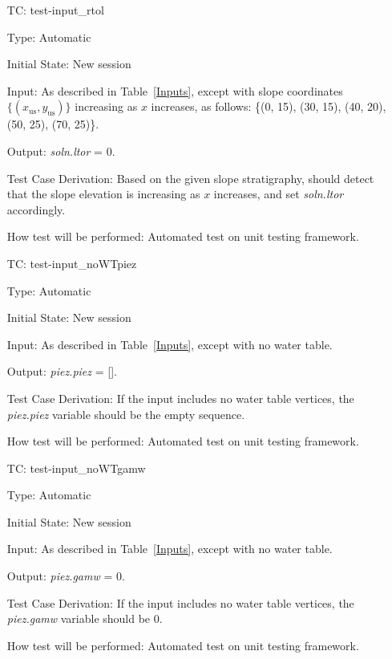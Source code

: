 \documentclass[12pt, titlepage]{article}
\newcounter{utestnum} %
\begin{document}
\begin{enumerate}[label=TC\arabic*:,ref={\arabic*}]

\item [TC\refstepcounter{utestnum}\theutestnum: \label{TC_InputRtoL}] 
test-input\_rtol

Type: Automatic
					
Initial State: New session
					
Input: As described in Table~\ref{Inputs}, except with slope coordinates 
$\{\left(x_\text{us},y_\text{us}\right)\}$ increasing as $x$ increases, as 
follows: \{(0, 
15), (30, 15), (40, 20), (50, 25), (70, 25)\}.
					
Output: \textit{soln.ltor} = 0.

Test Case Derivation: Based on the given slope stratigraphy, \progname{} should 
detect that the slope elevation is increasing as $x$ increases, and set 
\textit{soln.ltor} accordingly.

How test will be performed: Automated test on unit testing framework.
					
\item [TC\refstepcounter{utestnum}\theutestnum: \label{TC_InputNoWTpiez}] 
test-input\_noWTpiez

Type: Automatic

Initial State: New session

Input: As described in Table~\ref{Inputs}, except with no water table.

Output: \textit{piez.piez} = [].

Test Case Derivation: If the input includes no water table vertices, the 
\textit{piez.piez} variable should be the empty sequence.

How test will be performed: Automated test on unit testing framework.

\item [TC\refstepcounter{utestnum}\theutestnum: \label{TC_InputNoWTgamw}] 
test-input\_noWTgamw

Type: Automatic

Initial State: New session

Input: As described in Table~\ref{Inputs}, except with no water table.

Output: \textit{piez.gamw} = 0.

Test Case Derivation: If the input includes no water table vertices, the 
\textit{piez.gamw} variable should be 0.

How test will be performed: Automated test on unit testing framework.


\end{enumerate}
\end{document}
